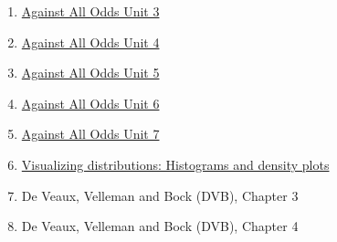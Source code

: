 \documentclass[letterpaper,12pt,twoside,]{pinp}
\providecommand{\tightlist}{%
  \setlength{\itemsep}{0pt}\setlength{\parskip}{0pt}}
\begin{document}
\begin{enumerate}
\def\labelenumi{\arabic{enumi}.}
\tightlist
\item
  \href{https://www.learner.org/wp-content/uploads/2019/03/AgainstAllOdds_StudentGuide_Unit03.pdf}{Against
  All Odds Unit 3}
\item
  \href{https://www.learner.org/wp-content/uploads/2019/03/AgainstAllOdds_StudentGuide_Unit04.pdf}{Against
  All Odds Unit 4}
\item
  \href{https://www.learner.org/wp-content/uploads/2019/03/AgainstAllOdds_StudentGuide_Unit05-1.pdf}{Against
  All Odds Unit 5}
\item
  \href{https://www.learner.org/wp-content/uploads/2019/03/AgainstAllOdds_StudentGuide_Unit06-Standard-Deviation.pdf}{Against
  All Odds Unit 6}
\item
  \href{https://www.learner.org/wp-content/uploads/2019/03/AgainstAllOdds_StudentGuide_Unit07-Normal-Curves.pdf}{Against
  All Odds Unit 7}
\item
  \href{https://clauswilke.com/dataviz/histograms-density-plots.html}{Visualizing
  distributions: Histograms and density plots}
\item
  De Veaux, Velleman and Bock (DVB), Chapter 3
\item
  De Veaux, Velleman and Bock (DVB), Chapter 4
\end{enumerate}





\end{document}
